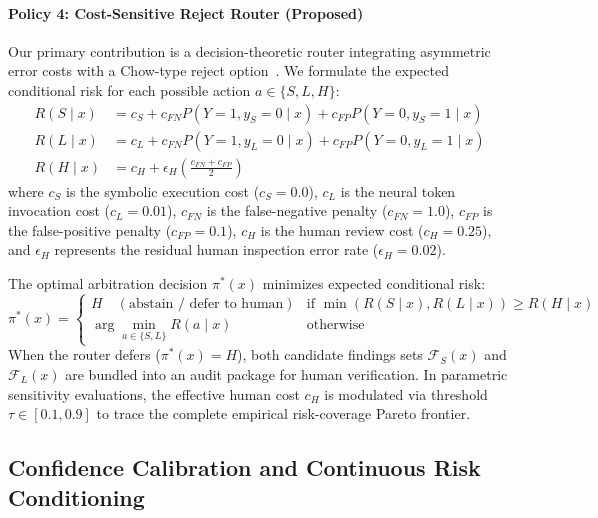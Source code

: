 \paragraph{Policy 4: Cost-Sensitive Reject Router (Proposed)}
Our primary contribution is a decision-theoretic router integrating asymmetric error costs with a Chow-type reject option~\cite{chow1970optimum,madras2018predict}. We formulate the expected conditional risk for each possible action $a \in \{S, L, H\}$:
\begin{align}
R(S \mid x) &= c_S + c_{FN} P(Y=1, y_S=0 \mid x) + c_{FP} P(Y=0, y_S=1 \mid x) \label{eq:risk_s} \\
R(L \mid x) &= c_L + c_{FN} P(Y=1, y_L=0 \mid x) + c_{FP} P(Y=0, y_L=1 \mid x) \label{eq:risk_l} \\
R(H \mid x) &= c_H + \epsilon_H \left( \frac{c_{FN} + c_{FP}}{2} \right) \label{eq:risk_h}
\end{align}
where $c_S$ is the symbolic execution cost ($c_S = 0.0$), $c_L$ is the neural token invocation cost ($c_L = 0.01$), $c_{FN}$ is the false-negative penalty ($c_{FN} = 1.0$), $c_{FP}$ is the false-positive penalty ($c_{FP} = 0.1$), $c_H$ is the human review cost ($c_H = 0.25$), and $\epsilon_H$ represents the residual human inspection error rate ($\epsilon_H = 0.02$).

The optimal arbitration decision $\pi^*(x)$ minimizes expected conditional risk:
\begin{equation}
\label{eq:decision_rule}
\pi^*(x) = \begin{cases}
H \quad (\text{abstain / defer to human}) & \text{if } \min\left( R(S \mid x), R(L \mid x) \right) \ge R(H \mid x) \\
\arg\min_{a \in \{S, L\}} R(a \mid x) & \text{otherwise}
\end{cases}
\end{equation}
When the router defers ($\pi^*(x) = H$), both candidate findings sets $\mathcal{F}_S(x)$ and $\mathcal{F}_L(x)$ are bundled into an audit package for human verification. In parametric sensitivity evaluations, the effective human cost $c_H$ is modulated via threshold $\tau \in [0.1, 0.9]$ to trace the complete empirical risk-coverage Pareto frontier.

\subsection{Confidence Calibration and Continuous Risk Conditioning}
\label{sec:methodology:calibration}


